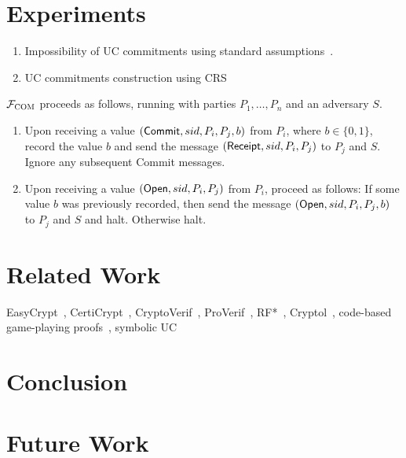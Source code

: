 \documentclass[acmsmall,review,anonymous]{acmart}\settopmatter{printfolios=true,printccs=false,printacmref=false}
\begin{document}
\section{Experiments}\label{sec:experiments}



\begin{enumerate}
\item Impossibility of UC commitments using standard
assumptions~\cite{canetti2001commitments}.
\item UC commitments construction using CRS
\end{enumerate}

\begin{func}[COM]
    $\mathcal{F}_{\textsc{COM}}$ proceeds as follows, running with parties $P_1, \ldots, P_n$ and an adversary $S$.
    \begin{enumerate}
        \item Upon receiving a value $({\sf Commit}, sid, P_i, P_j, b)$ from
          $P_i$, where $b \in \{ 0, 1 \}$, record the value $b$ and send the
          message $({\sf Receipt}, sid, P_i, P_j)$ to $P_j$ and $S$. Ignore any
          subsequent {\sf Commit} messages.

        \item Upon receiving a value $({\sf Open}, sid, P_i, P_j)$ from $P_i$,
          proceed as follows: If some value $b$ was previously recorded, then
          send the message $({\sf Open}, sid, P_i, P_j, b)$ to $P_j$ and $S$ and halt. Otherwise halt.
    \end{enumerate}
\end{func}



\section{Related Work}
EasyCrypt~\cite{barthe2011computer}, CertiCrypt~\cite{barthe2009formal},
CryptoVerif~\cite{blanchet2007cryptoverif},
ProVerif~\cite{blanchet2005proverif}, RF*~\cite{barthe2014probabilistic},
Cryptol~\cite{lewis2003cryptol}, code-based game-playing
proofs~\cite{bellare2006security}, symbolic UC~\cite{bohl2016symbolic}
\section{Conclusion}

\section{Future Work}
\end{document}
